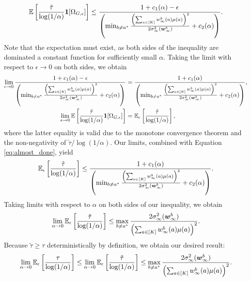 \documentclass{article}
\begin{document}
\begin{appendices}
\begin{equation}\label{eq:almost_done}
    \mathbb{E}\left[ \frac{\tilde\tau}{\log(1/\alpha)} \mathbf{1}[\Omega_{G, \epsilon}] \right] \leq \frac{1+c_1(\alpha) - \epsilon}{\left( \min_{b \neq a^*}\frac{\left(\sum_{a \in [K] }w_\infty^b(a)\mu(a) \right)^2}{2\sigma^2_{\infty}(\boldsymbol{w}_\infty^b)} + c_2(\alpha)\right)}.
\end{equation}
Note that the expectation must exist, as both sides of the inequality are dominated a constant function for sufficiently small $\alpha$. Taking the limit with respect to $\epsilon \rightarrow 0$ on both sides, we obtain
\begin{align}
    \lim_{\epsilon \rightarrow 0}\frac{1+c_1(\alpha) - \epsilon}{\left( \min_{b \neq a^*}\frac{\left(\sum_{a \in [K] }w_\infty^b(a)\mu(a) \right)^2}{2\sigma^2_{\infty}(\boldsymbol{w}_\infty^b)} + c_2(\alpha)\right)} &= \frac{1+c_1(\alpha)}{\left( \min_{b \neq a^*}\frac{\left(\sum_{a \in [K] }w_\infty^b(a)\mu(a) \right)^2}{2\sigma^2_{\infty}(\boldsymbol{w}_\infty^b)} + c_2(\alpha)\right)}, \\
    \lim_{\epsilon \rightarrow 0} \mathbb{E}\left[ \frac{\tilde\tau}{\log(1/\alpha)} \mathbf{1}[\Omega_{G, \epsilon}] \right] &= \mathbb{E}_{\epsilon}\left[ \frac{\tilde{\tau}}{\log(1/\alpha)} \right],
\end{align}
where the latter equality is valid due to the monotone convergence theorem and the non-negativity of $\tilde{\tau}/\log(1/\alpha)$. Our limits, combined with Equation \eqref{eq:almost_done}, yield
\begin{equation}
\mathbb{E}_{\epsilon}\left[ \frac{\tilde{\tau}}{\log(1/\alpha)} \right] \leq \frac{1+c_1(\alpha)}{\left( \min_{b \neq a^*}\frac{\left(\sum_{a \in [K] }w_\infty^b(a)\mu(a) \right)^2}{2\sigma^2_{\infty}(\boldsymbol{w}_\infty^b)} + c_2(\alpha)\right)}.
\end{equation}
Taking limits with respect to $\alpha$ on both sides of our inequality, we obtain 
\begin{equation}
\lim_{\alpha \rightarrow 0}\mathbb{E}_{\epsilon}\left[ \frac{\tilde{\tau}}{\log(1/\alpha)} \right] \leq \max_{b \neq a^*}\frac{2\sigma^2_{\infty}(\boldsymbol{w}_\infty^b)}{\left(\sum_{a \in [K] }w_\infty^b(a)\mu(a) \right)^2}.
\end{equation}
Because $\tilde{\tau} \geq \tau$ deterministically by definition, we obtain our desired result:
\begin{equation}
    \lim_{\alpha \rightarrow 0}\mathbb{E}_{\epsilon}\left[ \frac{{\tau}}{\log(1/\alpha)} \right]\leq \lim_{\alpha \rightarrow 0}\mathbb{E}_{\epsilon}\left[ \frac{\tilde{\tau}}{\log(1/\alpha)} \right] \leq \max_{b \neq a^*}\frac{2\sigma^2_{\infty}(\boldsymbol{w}_\infty^b)}{\left(\sum_{a \in [K] }w_\infty^b(a)\mu(a) \right)^2}.
\end{equation}



\end{appendices}
\end{document}
